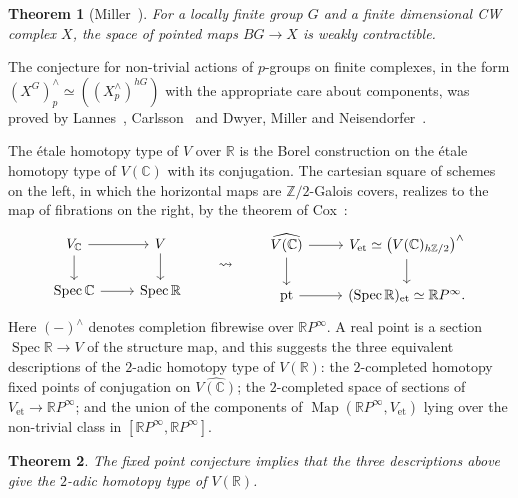 \documentclass[11pt]{amsart}
\theoremstyle{plain}
\newtheorem{theorem}{Theorem}[section]
\theoremstyle{definition}
\numberwithin{equation}{section}
\newcommand{\Z}{\mathbb{Z}}
\newcommand{\R}{\mathbb{R}}
\newcommand{\C}{\mathbb{C}}
\newcommand{\RP}{\mathbb{R}P}
\DeclareMathOperator{\Map}{Map}
\DeclareMathOperator{\Spec}{Spec}
\begin{document}
\begin{theorem}[Miller~\cite{Miller}]
For a locally finite group $G$ and a finite dimensional CW complex $X$, the space of pointed maps $BG\to X$ is weakly contractible.
\end{theorem}

The conjecture for non-trivial actions of $p$-groups on finite complexes, in the form $(X^{G})^\wedge_p\simeq((X^\wedge_p)^{hG})$ with the appropriate care about components, was proved by Lannes~\cite{Lannes}, Carlsson~\cite{Carlsson} and Dwyer, Miller and Neisendorfer~\cite{DMN}.

The \'etale homotopy type of $V$ over $\R$ is the Borel construction on the \'etale homotopy type of $V(\C)$ with its conjugation.
The cartesian square of schemes on the left, in which the horizontal maps are $\Z/2$-Galois covers, realizes to the map of fibrations on the right, by the theorem of Cox~\cite{Cox}:
\[
\begin{tikzcd}
V_\C\arrow[r]\arrow[d] & V\arrow[d]\\
\Spec\C\arrow[r] & \Spec\R
\end{tikzcd}
\qquad\leadsto\qquad
\begin{tikzcd}
\widehat{V(\C)}\arrow[r]\arrow[d] & V_{\mathrm{et}}\simeq\bigl(V(\C)_{h\Z/2}\bigr)^\wedge\arrow[d]\\
\mathrm{pt}\arrow[r] & (\Spec\R)_{\mathrm{et}}\simeq\RP^\infty .
\end{tikzcd}
\]
Here $(-)^\wedge$ denotes completion fibrewise over $\RP^\infty$.
A real point is a section $\Spec\R\to V$ of the structure map, and this suggests the three equivalent descriptions of the $2$-adic homotopy type of $V(\R)$: the $2$-completed homotopy fixed points of conjugation on $\widehat{V(\C)}$; the $2$-completed space of sections of $V_{\mathrm{et}}\to\RP^\infty$; and the union of the components of $\Map(\RP^\infty,V_{\mathrm{et}})$ lying over the non-trivial class in $[\RP^\infty,\RP^\infty]$.

\begin{theorem}\label{thm:realetale}
The fixed point conjecture implies that the three descriptions above give the $2$-adic homotopy type of $V(\R)$.
\end{theorem}
\end{document}
